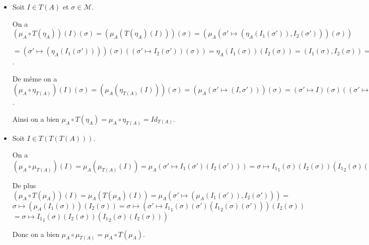 \documentclass{article}
\newcommand{\M}{\mathcal{M}}
\begin{document}
\begin{itemize}
\item Soit $I \in T\left (A\right )$ et $\sigma \in \M$.

  On a $\left (\mu_A \circ T\left (\eta_A\right )\right )\left (I\right )\left (\sigma\right ) = \left (\mu_A\left (T\left (\eta_A\right )\left (I\right )\right )\right )\left (\sigma\right ) = \left (\mu_A\left (\sigma' \mapsto \left (\eta_A\left (I_1\left (\sigma'\right )\right ), I_2\left (\sigma'\right )\right )\right )\left (\sigma \right )\right )$
  
   $ = \left (\sigma' \mapsto \left (\eta_A\left (I_1\left (\sigma'\right )\right )\right )\right )\left (\sigma\right )\left (\left (\sigma' \mapsto I_2\left (\sigma'\right )\right )\left (\sigma\right )\right ) = \eta_A \left (I_1\left (\sigma\right )\right )\left (I_2\left (\sigma\right )\right ) = \left (I_1\left (\sigma\right ), I_2\left (\sigma\right )\right ) = I\left (\sigma\right )$.

De même on a $\left (\mu_A \circ \eta_{T\left (A\right )}\right )\left (I\right )\left (\sigma\right ) = \left (\mu_A\left (\eta_{T\left (A\right )}\left (I\right )\right )\right )\left (\sigma\right ) = \left (\mu_A\left (\sigma' \mapsto \left (I, \sigma'\right )\right )\right )\left (\sigma\right ) = \left (\sigma' \mapsto I\right )\left (\sigma\right )\left (\left (\sigma' \mapsto \sigma'\right )\left (\sigma\right )\right ) = I\left (\sigma\right )$.

Ainsi on a bien $\mu_A \circ T\left (\eta_A\right ) = \mu_A \circ \eta_{T\left (A\right )} = Id_{T\left (A\right )}$.

\item Soit $I \in T\left (T\left (T\left (A\right )\right )\right )$.

 On a $\left (\mu_A \circ \mu_{T\left (A\right )}\right )\left (I\right ) = \mu_A\left (\mu_{T\left (A\right )}\left (I\right )\right ) = \mu_A\left (\sigma' \mapsto I_1\left (\sigma'\right )\left (I_2\left (\sigma'\right )\right )\right ) = \sigma \mapsto {I_1}_1\left (\sigma\right )\left (I_2\left (\sigma\right )\right )\left ({I_1}_2\left (\sigma\right )\left (I_2\left (\sigma\right )\right )\right )$

De plus $\left (\mu_A \circ T\left (\mu_A\right )\right )\left (I\right ) = \mu_A\left (T\left (\mu_A\right )\left (I\right )\right ) = \mu_A\left (\sigma' \mapsto \left (\mu_A\left (I_1\left (\sigma'\right )\right ), I_2\left (\sigma'\right )\right )\right ) =$ 
$ \sigma \mapsto \left (\mu_A\left (I_1\left (\sigma\right )\right )\right )\left (I_2\left (\sigma\right )\right ) = \sigma \mapsto \left (\sigma' \mapsto {I_1}_1\left (\sigma\right )\left (\sigma'\right )\left ({I_1}_2\left (\sigma\right )\left (\sigma'\right )\right )\right )\left (I_2\left (\sigma\right )\right ) $
$= \sigma \mapsto {I_1}_1\left (\sigma\right )\left (I_2\left (\sigma\right )\right )\left ({I_1}_2\left (\sigma\right )\left (I_2\left (\sigma\right )\right )\right )$
 
 Donc on a bien $\mu_A \circ \mu_{T\left (A\right )} = \mu_A \circ T\left (\mu_A\right )$.
 
 \end{itemize}
 
\end{document}
